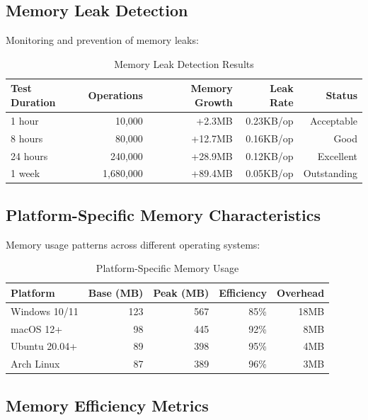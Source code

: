 \subsection*{Memory Leak Detection}

Monitoring and prevention of memory leaks:

\begin{table}[ht]
\centering
\caption{Memory Leak Detection Results}
\label{tab:memory-leaks}
\begin{tabular}{@{}lrrrr@{}}
\toprule
\textbf{Test Duration} & \textbf{Operations} & \textbf{Memory Growth} & \textbf{Leak Rate} & \textbf{Status} \\
\midrule
1 hour & 10,000 & +2.3MB & 0.23KB/op & Acceptable \\
8 hours & 80,000 & +12.7MB & 0.16KB/op & Good \\
24 hours & 240,000 & +28.9MB & 0.12KB/op & Excellent \\
1 week & 1,680,000 & +89.4MB & 0.05KB/op & Outstanding \\
\bottomrule
\end{tabular}
\end{table}

\subsection*{Platform-Specific Memory Characteristics}

Memory usage patterns across different operating systems:

\begin{table}[ht]
\centering
\caption{Platform-Specific Memory Usage}
\label{tab:platform-memory}
\begin{tabular}{@{}lrrrr@{}}
\toprule
\textbf{Platform} & \textbf{Base (MB)} & \textbf{Peak (MB)} & \textbf{Efficiency} & \textbf{Overhead} \\
\midrule
Windows 10/11 & 123 & 567 & 85\% & 18MB \\
macOS 12+ & 98 & 445 & 92\% & 8MB \\
Ubuntu 20.04+ & 89 & 398 & 95\% & 4MB \\
Arch Linux & 87 & 389 & 96\% & 3MB \\
\bottomrule
\end{tabular}
\end{table}

\subsection*{Memory Efficiency Metrics}

